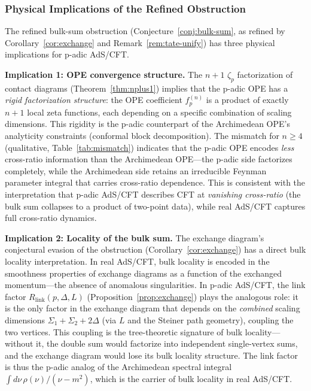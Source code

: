 \documentclass[11pt,a4paper]{article}
\begin{document}
\subsubsection{Physical Implications of the Refined Obstruction}
\label{sec:physical-impl}

The refined bulk-sum obstruction (Conjecture~\ref{conj:bulk-sum}, as refined by Corollary~\ref{cor:exchange} and Remark~\ref{rem:tate-unify}) has three physical implications for p-adic AdS/CFT.

\textbf{Implication 1: OPE convergence structure.} The $n{+}1$ $\zeta_p$ factorization of contact diagrams (Theorem~\ref{thm:nplus1}) implies that the p-adic OPE has a \emph{rigid factorization structure}: the OPE coefficient $f_p^{(n)}$ is a product of exactly $n{+}1$ local zeta functions, each depending on a specific combination of scaling dimensions. This rigidity is the p-adic counterpart of the Archimedean OPE's analyticity constraints (conformal block decomposition). The mismatch for $n \geq 4$ (qualitative, Table~\ref{tab:mismatch}) indicates that the p-adic OPE encodes \emph{less} cross-ratio information than the Archimedean OPE---the p-adic side factorizes completely, while the Archimedean side retains an irreducible Feynman parameter integral that carries cross-ratio dependence. This is consistent with the interpretation that p-adic AdS/CFT describes CFT at \emph{vanishing cross-ratio} (the bulk sum collapses to a product of two-point data), while real AdS/CFT captures full cross-ratio dynamics.

\textbf{Implication 2: Locality of the bulk sum.} The exchange diagram's conjectural evasion of the obstruction (Corollary~\ref{cor:exchange}) has a direct bulk locality interpretation. In real AdS/CFT, bulk locality is encoded in the smoothness properties of exchange diagrams as a function of the exchanged momentum---the absence of anomalous singularities. In p-adic AdS/CFT, the link factor $R_{\mathrm{link}}(p, \Delta, L)$ (Proposition~\ref{prop:exchange}) plays the analogous role: it is the only factor in the exchange diagram that depends on the \emph{combined} scaling dimensions $\Sigma_1 + \Sigma_2 + 2\Delta$ (via $L$ and the Steiner path geometry), coupling the two vertices. This coupling is the tree-theoretic signature of bulk locality---without it, the double sum would factorize into independent single-vertex sums, and the exchange diagram would lose its bulk locality structure. The link factor is thus the p-adic analog of the Archimedean spectral integral $\int d\nu\, \rho(\nu) / (\nu - m^2)$, which is the carrier of bulk locality in real AdS/CFT.
\end{document}
